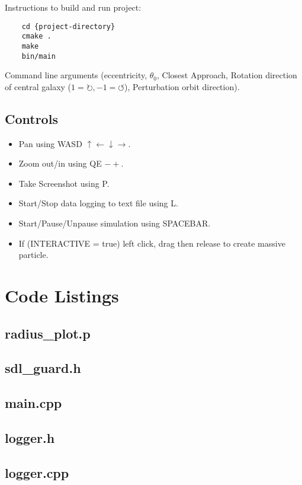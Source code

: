 \documentclass[10pt,a4paper]{article}
\begin{document}
Instructions to build and run project:

\begin{lstlisting}
	cd {project-directory}
	cmake .
	make
	bin/main
\end{lstlisting}
Command line arguments (eccentricity, $\theta_0$, Closest Approach, Rotation direction of central galaxy ($1=\circlearrowright, -1=\circlearrowleft$), Perturbation orbit direction).

\subsection{Controls}
\begin{itemize}
\item Pan using WASD $\uparrow \leftarrow \downarrow \rightarrow$.
\item Zoom out/in using QE $-+$.
\item Take Screenshot using P.
\item Start/Stop data logging to text file using L.
\item Start/Pause/Unpause simulation using SPACEBAR.
\item If (INTERACTIVE = true) left click, drag then release to create massive particle.
\end{itemize}

\clearpage
{}
\section{Code Listings}
\subsection{radius\_plot.p}

\subsection{sdl\_guard.h}

\clearpage
\subsection{main.cpp}

\clearpage
\subsection{logger.h}

\subsection{logger.cpp}

\clearpage
\end{document}

